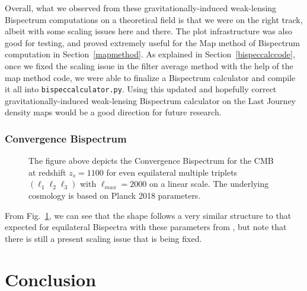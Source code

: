 \documentclass[11pt]{article}
\renewcommand{\_}[1]{\underline{ #1 }}
\newcommand{\us}{\textunderscore}
\begin{document}
{Overall, what we observed from these gravitationally-induced weak-lensing Bispectrum computations on a theoretical field is that we were on the right track, albeit with some scaling issues here and there. The plot infrastructure was also good for testing, and proved extremely useful for the Map method of Bispectrum computation in Section~\ref{mapmethod}. As explained in Section~\ref{bispeccalccode}, once we fixed the scaling issue in the filter average method with the help of the map method code, we were able to finalize a Bispectrum calculator and compile it all into \texttt{bispec\us calculator.py}. Using this updated and hopefully correct gravitationally-induced weak-lensing Bispectrum calculator on the Last Journey density maps would be a good direction for future research.

\subsubsection{Convergence Bispectrum}\label{conv_bispec_plots}

\begin{figure}[H]
    \centering
    \caption{The figure above depicts the Convergence Bispectrum for the CMB at redshift $z_s = 1100$ for even equilateral multiple triplets $(\ell_1 \ell_2 \ell_3)$ with $\ell_{max} = 2000$ on a linear scale. The underlying cosmology is based on Planck 2018 parameters.}\label{fig:conv_bispec_plot}
\end{figure}

From Fig.~\ref{fig:conv_bispec_plot},  we can see that the shape follows a very similar structure to that expected for equilateral Bispectra with these parameters from \cite{Namikawa_2019}, but note that there is still a present scaling issue that is being fixed.

\section{Conclusion}

}
\end{document}
